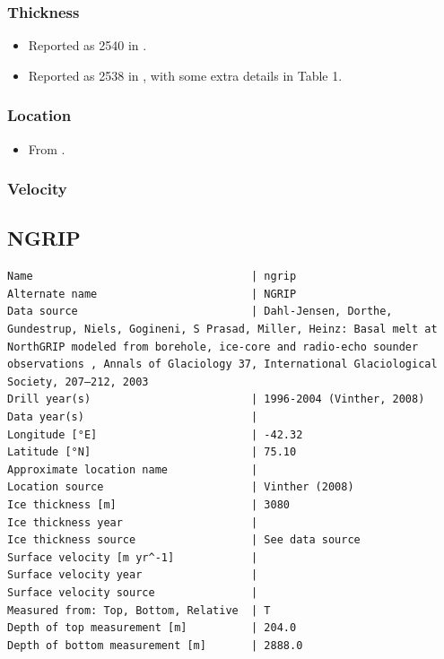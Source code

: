 \documentclass[article,a4paper,times,11pt,twoside]{article}
\begin{document}
\subsubsection{Thickness}
\label{sec:org8ea7704}

\begin{itemize}
\item Reported as 2540 in \textcite{dahl-jensen_2013}.
\item Reported as 2538 in \textcite{macgregor_2016}, with some extra details in Table 1.
\end{itemize}

\subsubsection{Location}
\label{sec:org8a03200}

\begin{itemize}
\item From \textcite{dahl-jensen_2013}.
\end{itemize}

\subsubsection{Velocity}
\label{sec:org6342e17}
\clearpage
\subsection{NGRIP}
\label{sec:org180f421}
\begin{verbatim}
Name                                  | ngrip
Alternate name                        | NGRIP
Data source                           | Dahl-Jensen, Dorthe, Gundestrup, Niels, Gogineni, S Prasad, Miller, Heinz: Basal melt at NorthGRIP modeled from borehole, ice-core and radio-echo sounder observations , Annals of Glaciology 37, International Glaciological Society, 207–212, 2003 
Drill year(s)                         | 1996-2004 (Vinther, 2008)
Data year(s)                          | 
Longitude [°E]                        | -42.32
Latitude [°N]                         | 75.10
Approximate location name             | 
Location source                       | Vinther (2008)
Ice thickness [m]                     | 3080
Ice thickness year                    | 
Ice thickness source                  | See data source
Surface velocity [m yr^-1]            | 
Surface velocity year                 | 
Surface velocity source               | 
Measured from: Top, Bottom, Relative  | T
Depth of top measurement [m]          | 204.0
Depth of bottom measurement [m]       | 2888.0
\end{verbatim}
\end{document}
